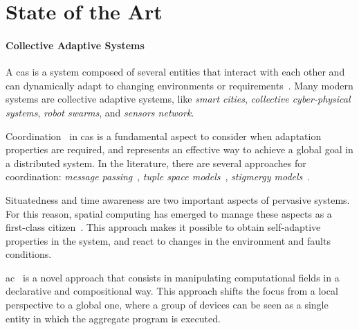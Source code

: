 \documentclass[12pt]{article}
\begin{document}
\section{State of the Art}\label{sec:state-of-the-art}

\paragraph{Collective Adaptive Systems}
A \ac{cas} is a system composed of several entities that interact with each other and can dynamically adapt to changing environments or requirements~\cite{DBLP:conf/birthday/HolzlW11}.
%
Many modern systems are collective adaptive systems,
like \emph{smart cities}, \emph{collective cyber-physical systems}, \emph{robot swarms}, and \emph{sensors network}.

Coordination~\cite{DBLP:journals/csur/Ciancarini96} in \ac{cas} is a fundamental aspect to consider when adaptation properties are required,
and represents an effective way to achieve a global goal in a distributed system.
%
In the literature,
there are several approaches for coordination:
\emph{message passing}~\cite{DBLP:journals/jacm/HondaYC16}, \emph{tuple space models}~\cite{DBLP:books/sp/omicini01/RossiCD01}, \emph{stigmergy models}~\cite{DBLP:journals/cogsr/Heylighen16}.

Situatedness and time awareness are two important aspects of pervasive systems.
%
For this reason,
spatial computing has emerged to manage these aspects as a first-class citizen~\cite{Beal_Viroli_2015}.
%
This approach makes it possible to obtain self-adaptive properties in the system,
and react to changes in the environment and faults conditions.

\ac{ac}~\cite{DBLP:journals/computer/BealPV15} is a novel approach that consists in manipulating computational fields in a declarative and compositional way.
%
This approach shifts the focus from a local perspective to a global one,
where a group of devices can be seen as a single entity in which the aggregate program is executed.
\end{document}
